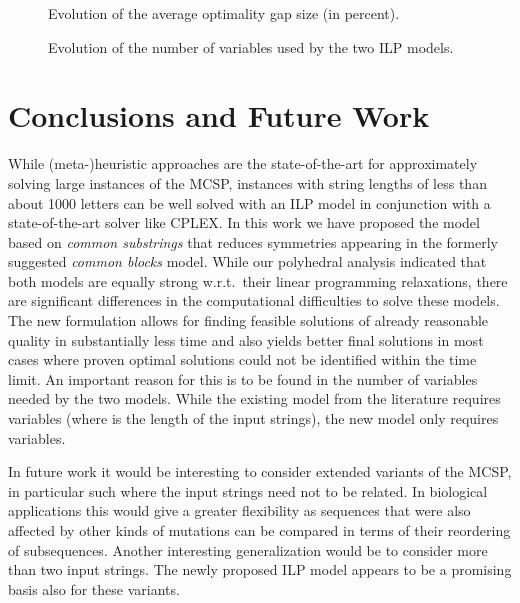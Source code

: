 \documentclass[11pt,a4paper]{article}
\begin{document}
\begin{figure}[!t]
\centering
{}
\caption{Evolution of the average optimality gap size (in percent).}
\label{fig:gapsize}
\end{figure}

\begin{figure}[!t]
\centering
{}
\caption{Evolution of the number of variables used by the two ILP models.}
\label{fig:variables}
\end{figure}


\section{Conclusions and Future Work}
\label{sec:conclusions}

While (meta-)heuristic approaches are the state-of-the-art for
approximately solving large instances of the MCSP, instances with string
lengths of less than about 1000 letters can be well solved with 
an ILP model in conjunction with a state-of-the-art solver like CPLEX. 
In this work we have proposed the model based on \emph{common substrings} that
reduces symmetries appearing in the formerly suggested \emph{common blocks}
model. While our polyhedral analysis indicated that both models are
equally strong w.r.t.\ their linear programming relaxations, there are
significant differences in the computational difficulties to solve these
models. The new formulation allows for finding feasible solutions of
already reasonable quality in substantially less time and also yields 
better final solutions in most cases where proven optimal solutions could not 
be identified within the time limit. An important reason for this is to be found in the number of variables needed by the two models. While the existing model from the literature requires  variables (where  is the length of the input strings), the new model only requires  variables.

In future work it would be interesting to consider
extended variants of the MCSP, in particular such where the input
strings need not to be related. In biological applications this would
give a greater flexibility as sequences that were also
affected by other kinds of mutations can be compared in terms of their 
reordering of subsequences. Another interesting generalization would be
to consider more than two input strings. The newly proposed ILP model 
appears to be a promising basis also for these variants.
\end{document}
